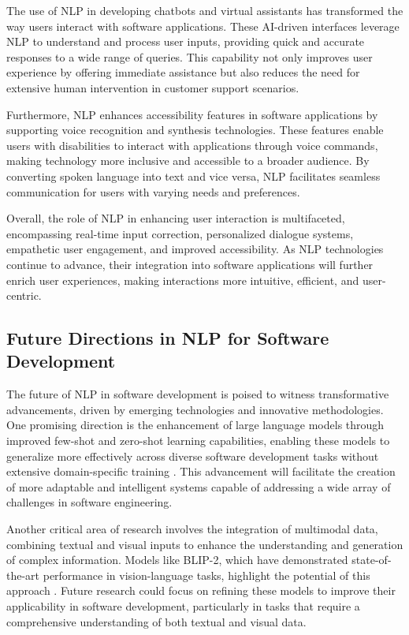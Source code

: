 The use of NLP in developing chatbots and virtual assistants has transformed the way users interact with software applications. These AI-driven interfaces leverage NLP to understand and process user inputs, providing quick and accurate responses to a wide range of queries. This capability not only improves user experience by offering immediate assistance but also reduces the need for extensive human intervention in customer support scenarios.



Furthermore, NLP enhances accessibility features in software applications by supporting voice recognition and synthesis technologies. These features enable users with disabilities to interact with applications through voice commands, making technology more inclusive and accessible to a broader audience. By converting spoken language into text and vice versa, NLP facilitates seamless communication for users with varying needs and preferences.



Overall, the role of NLP in enhancing user interaction is multifaceted, encompassing real-time input correction, personalized dialogue systems, empathetic user engagement, and improved accessibility. As NLP technologies continue to advance, their integration into software applications will further enrich user experiences, making interactions more intuitive, efficient, and user-centric.



\subsection{Future Directions in NLP for Software Development} \label{subsec:Future Directions in NLP for Software Development}



The future of NLP in software development is poised to witness transformative advancements, driven by emerging technologies and innovative methodologies. One promising direction is the enhancement of large language models through improved few-shot and zero-shot learning capabilities, enabling these models to generalize more effectively across diverse software development tasks without extensive domain-specific training \cite{chowdhery2023palm}. This advancement will facilitate the creation of more adaptable and intelligent systems capable of addressing a wide array of challenges in software engineering.



Another critical area of research involves the integration of multimodal data, combining textual and visual inputs to enhance the understanding and generation of complex information. Models like BLIP-2, which have demonstrated state-of-the-art performance in vision-language tasks, highlight the potential of this approach \cite{li2023blip}. Future research could focus on refining these models to improve their applicability in software development, particularly in tasks that require a comprehensive understanding of both textual and visual data.



